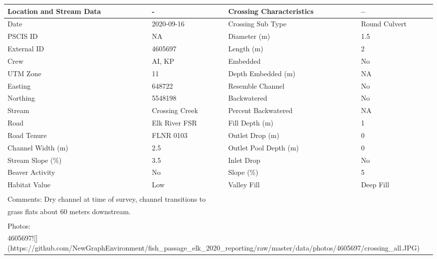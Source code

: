 \documentclass[
]{book}
\begin{document}
\begin{tabular}{l|l|l|l}
\hline
Location and Stream Data & - & Crossing Characteristics & --\\
\hline
Date & 2020-09-16 & Crossing Sub Type & Round Culvert\\
\hline
PSCIS ID & NA & Diameter (m) & 1.5\\
\hline
External ID & 4605697 & Length (m) & 2\\
\hline
Crew & AI, KP & Embedded & No\\
\hline
UTM Zone & 11 & Depth Embedded (m) & NA\\
\hline
Easting & 648722 & Resemble Channel & No\\
\hline
Northing & 5548198 & Backwatered & No\\
\hline
Stream & Crossing Creek & Percent Backwatered & NA\\
\hline
Road & Elk River FSR & Fill Depth (m) & 1\\
\hline
Road Tenure & FLNR 0103 & Outlet Drop (m) & 0\\
\hline
Channel Width (m) & 2.5 & Outlet Pool Depth (m) & 0\\
\hline
Stream Slope (\%) & 3.5 & Inlet Drop & No\\
\hline
Beaver Activity & No & Slope (\%) & 5\\
\hline
Habitat Value & Low & Valley Fill & Deep Fill\\
\hline
\multicolumn{4}{l}{\textsuperscript{} Comments: Dry channel at time of survey, channel transitions to}\\
\multicolumn{4}{l}{grass flats about 60 meters downstream.}\\
\multicolumn{4}{l}{\textsuperscript{} Photos:}\\
\multicolumn{4}{l}{4605697![](https://github.com/NewGraphEnvironment/fish\_passage\_elk\_2020\_reporting/raw/master/data/photos/4605697/crossing\_all.JPG)}\\
\end{tabular}
\end{document}
